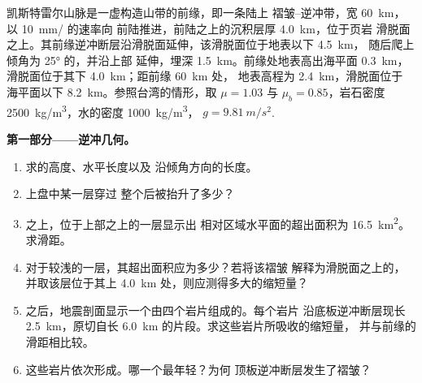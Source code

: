 \begin{problem}
\label{pb:b3:orogenic-wedges:1}
凯斯特雷尔山脉是一虚构造山带的前缘，即一条陆上
褶皱–逆冲带，宽 \qty{60}{km}，以 \qty{10}{mm/} 的速率向
前陆推进，前陆之上的沉积层厚 \qty{4.0}{km}，位于页岩
滑脱面之上。其前缘逆冲断层沿滑脱面延伸，该滑脱面位于地表以下 \qty{4.5}{km}，
随后爬上倾角为 \ang{25} 的，并沿上部
延伸，埋深 \qty{1.5}{km}。前缘处地表高出海平面 \qty{0.3}{km}，
滑脱面位于其下 \qty{4.0}{km}；距前缘 \qty{60}{km} 处，
地表高程为 \qty{2.4}{km}，滑脱面位于
海平面以下 \qty{8.2}{km}。参照台湾的情形，取 $\mu = 1.03$ 与 $\mu_b =
0.85$，岩石密度 \qty{2500}{kg/m^3}，水的密度 \qty{1000}{kg/m^3}，
$g = \qty{9.81}{m/s^2}$.

\medskip\noindent\textbf{第一部分——逆冲几何。}
\begin{enumerate}
  \item 求的高度、水平长度以及
        沿倾角方向的长度。
  \item 上盘中某一层穿过
        整个后被抬升了多少？
  \item {}之上，位于上部之上的一层显示出
        相对区域水平面的超出面积为 \qty{16.5}{km^2}。求滑距。
  \item 对于较浅的一层，其超出面积应为多少？若将该褶皱
        解释为滑脱面之上的，并取该层位于其上
        \qty{4.0}{km} 处，则应测得多大的缩短量？
  \item {}之后，地震剖面显示一个由四个岩片组成的。每个岩片
        沿底板逆冲断层现长 \qty{2.5}{km}，原切自长
        \qty{6.0}{km} 的片段。求这些岩片所吸收的缩短量，
        并与前缘的滑距相比较。
  \item 这些岩片依次形成。哪一个最年轻？为何
        顶板逆冲断层发生了褶皱？
\end{enumerate}


\end{problem}
